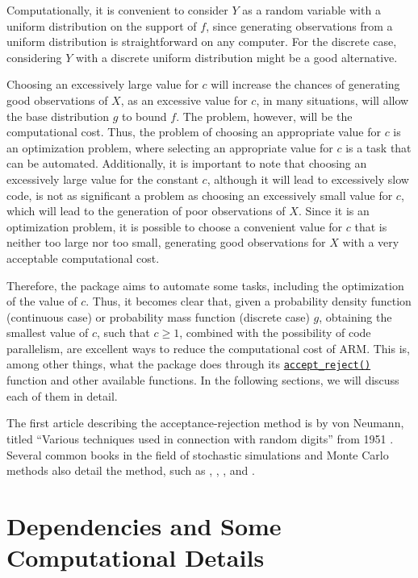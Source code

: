 Computationally, it is convenient to consider \(Y\) as a random variable with a uniform distribution on the support of \(f\), since generating observations from a uniform distribution is straightforward on any computer. For the discrete case, considering \(Y\) with a discrete uniform distribution might be a good alternative.

Choosing an excessively large value for \(c\) will increase the chances of generating good observations of \(X\), as an excessive value for \(c\), in many situations, will allow the base distribution \(g\) to bound \(f\). The problem, however, will be the computational cost. Thus, the problem of choosing an appropriate value for \(c\) is an optimization problem, where selecting an appropriate value for \(c\) is a task that can be automated. Additionally, it is important to note that choosing an excessively large value for the constant \(c\), although it will lead to excessively slow code, is not as significant a problem as choosing an excessively small value for \(c\), which will lead to the generation of poor observations of \(X\). Since it is an optimization problem, it is possible to choose a convenient value for \(c\) that is neither too large nor too small, generating good observations for \(X\) with a very acceptable computational cost.

Therefore, the  package aims to automate some tasks, including the optimization of the value of \(c\). Thus, it becomes clear that, given a probability density function (continuous case) or probability mass function (discrete case) \(g\), obtaining the smallest value of \(c\), such that \(c \geq 1\), combined with the possibility of code parallelism, are excellent ways to reduce the computational cost of ARM. This is, among other things, what the  package does through its \href{https://prdm0.github.io/AcceptReject/reference/accept_reject.html}{\texttt{accept\_reject()}} function and other available functions. In the following sections, we will discuss each of them in detail.

The first article describing the acceptance-rejection method is by von Neumann, titled ``Various techniques used in connection with random digits'' from 1951 \citep{neumann1951various}. Several common books in the field of stochastic simulations and Monte Carlo methods also detail the method, such as \citep{kroese2013handbook}, \citep{asmussen2007stochastic}, \citep{kemp2003discrete}, and \citep{gentle2003random}.

\section{Dependencies and Some Computational Details}\label{dependencies-and-some-computational-details}

